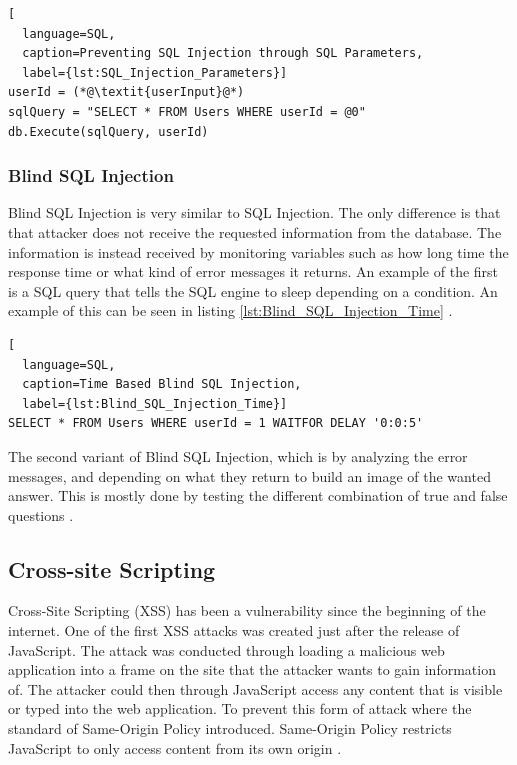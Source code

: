 \hfill
\begin{lstlisting}[
  language=SQL,
  caption=Preventing SQL Injection through SQL Parameters,
  label={lst:SQL_Injection_Parameters}]
userId = (*@\textit{userInput}@*)
sqlQuery = "SELECT * FROM Users WHERE userId = @0"
db.Execute(sqlQuery, userId)
\end{lstlisting}



\subsubsection{Blind SQL Injection}
Blind SQL Injection is very similar to SQL Injection. The only difference is that that attacker does not receive the requested information from the database. The information is instead received by monitoring variables such as how long time the response time or what kind of error messages it returns. An example of the first is a SQL query that tells the SQL engine to sleep depending on a condition. An example of this can be seen in listing \ref{lst:Blind_SQL_Injection_Time} \parencite{JustinClarke-Salt2009SIAa, Secure_Web}.

\hfill
\begin{lstlisting}[
  language=SQL,
  caption=Time Based Blind SQL Injection,
  label={lst:Blind_SQL_Injection_Time}]
SELECT * FROM Users WHERE userId = 1 WAITFOR DELAY '0:0:5'
\end{lstlisting}
\hfill

The second variant of Blind SQL Injection, which is by analyzing the error messages, and depending on what they return to build an image of the wanted answer. This is mostly done by testing the different combination of true and false questions \parencite{JustinClarke-Salt2009SIAa, Secure_Web}.



\subsection{Cross-site Scripting}
Cross-Site Scripting (XSS) has been a vulnerability since the beginning of the internet. One of the first XSS attacks was created just after the release of JavaScript. The attack was conducted through loading a malicious web application into a frame on the site that the attacker wants to gain information of. The attacker could then through JavaScript access any content that is visible or typed into the web application. To prevent this form of attack where the standard of Same-Origin Policy introduced. Same-Origin Policy restricts JavaScript to only access content from its own origin \parencite{FogieSeth2007Xacs, w3csop}.

